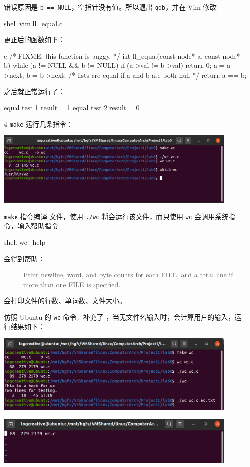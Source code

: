 \documentclass[12pt,a4paper]{article}
\newenvironment{problems}{\begin{list}{}{\renewcommand{\makelabel}[1]{\textbf{##1}.\hfil}}}{\end{list}}
\begin{document}
\begin{problems}
    错误原因是 \texttt{b == NULL}，空指针没有值。所以退出 \texttt{gdb}，并在 Vim 修改
    \begin{code}{shell}
        vim ll_equal.c
    \end{code}

    更正后的函数如下：

    \begin{code}{c}
/* FIXME: this function is buggy. */
int ll_equal(const node* a, const node* b) {
	while (a != NULL && b != NULL) {
		if (a->val != b->val)
			return 0;
		a = a->next;
		b = b->next;
	}
	/* lists are equal if a and b are both null */
	return a == b;
}
    \end{code}

    之后就正常运行了：
    \begin{literal}
equal test 1 result = 1
equal test 2 result = 0
    \end{literal}

    \item[4] \texttt{make}
    运行几条指令：
    
    \includegraphics[width=0.9\textwidth]{make.png}

    \texttt{make} 指令编译  文件，使用 \texttt{./wc} 将会运行该文件，而只使用 \texttt{wc} 会调用系统指令，输入帮助指令
    \begin{code}{shell}
        wc --help
    \end{code}
    会得到帮助：
    \begin{quote}
        Print newline, word, and byte counts for each FILE, and a total line if more than one FILE is specified.
    \end{quote}
    会打印文件的行数、单词数、文件大小。

    仿照 Ubuntu 的 \texttt{wc} 命令，补充了 ，当无文件名输入时，会计算用户的输入，运行结果如下：

    \includegraphics[width=0.9\textwidth]{wc.png}
    
    \includegraphics[width=0.9\textwidth]{wct.png}

    \inputminted[breaklines,autogobble,linenos,numbersep=1mm,frame=lines,framesep=2mm,fontsize=\scriptsize,]{c}{../lab0/wc.c}

\end{problems}
\end{document}
